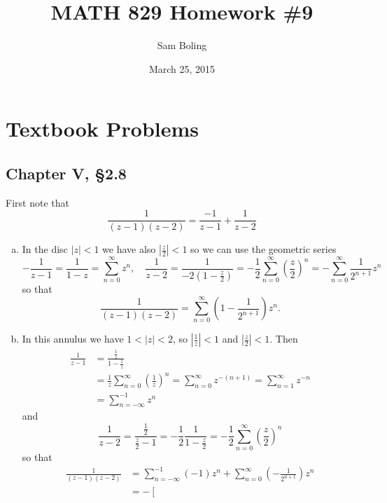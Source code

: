 \documentclass{article}
\title{MATH 829 Homework \#9}
\date{March 25, 2015}
\author{Sam Boling}
\newcounter{Problem}
\begin{document}
\begin{titlepage}
\maketitle
\end{titlepage}

\section{Textbook Problems}
\subsection{Chapter V, \S 2.8}
First note that
$$
  \frac{1}{(z - 1)(z-2)} 
= \frac{-1}{z - 1}
+ \frac{1}{z - 2}
$$
\begin{enumerate}[(a)]
  \item{
    In the disc $|z| < 1$ we have also $\left|\frac{z}{2}\right| < 1$ so we can
    use the geometric series
    $$
      -\frac{1}{z - 1} 
    =  \frac{1}{1 - z} 
    =  \sum_{n=0}^\infty z^n, \quad
      \frac{1}{z - 2} 
    = \frac{1}{-2(1 - \frac{z}{2})} 
    = -\frac{1}{2}
       \sum_{n=0}^\infty 
         \left(\frac{z}{2}\right)^n
    = -\sum_{n=0}^\infty
         \frac{1}{2^{n+1}} z^n
    $$
    so that
    $$
      \frac{1}{(z-1)(z-2)}
    = \sum_{n=0}^\infty 
        \left(
          1 - \frac{1}{2^{n+1}}
        \right)
        z^n.
    $$
  }
  \item{
    In this annulus we have $1 < |z| < 2$, so 
    $\left|\frac{1}{z}\right| < 1$ and 
    $\left|\frac{z}{2}\right| < 1$. Then
    \begin{align*}
       \frac{1}{z - 1} 
    &= \frac{\frac{1}{z}}
           {1 - \frac{1}{z}} \\
    &= \frac{1}{z}
       \sum_{n=0}^\infty 
         \left(\frac{1}{z}\right)^n
     = \sum_{n=0}^\infty z^{-(n+1)}
     = \sum_{n=1}^\infty z^{-n} \\
    &= \sum_{n=-\infty}^{-1} z^n
    \end{align*}
    and
    $$
      \frac{1}{z - 2}
    = \frac{\frac{1}{2}}
           {\frac{z}{2} - 1}
    = -\frac{1}{2}
       \frac{1}{1 - \frac{z}{2}}
    = -\frac{1}{2}
       \sum_{n=0}^\infty
         \left(\frac{z}{2}\right)^n
    $$
    so that
    \begin{align*}
       \frac{1}{(z-1)(z-2)}
    &= \sum_{n=-\infty}^{-1} 
        (-1) z^n
     + \sum_{n=0}^\infty 
        \left(-\frac{1}{2^{n+1}}\right) z^n \\
    &= -\left[

\end{align*}}
\end{enumerate}
\end{document}
